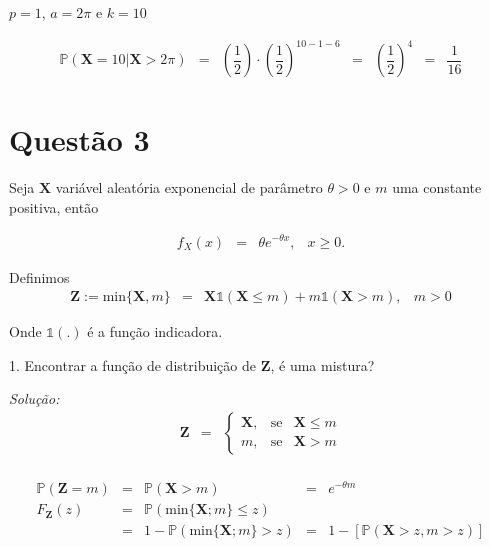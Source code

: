 \documentclass[a4paper, 11pt]{article}
\begin{document}
$p=1$, $a=2\pi$ e $k=10$

\begin{equation*}
\begin{array}{rclllll}
\mathds{P}(\mathbf{X} = 10|\mathbf{X}>2\pi) & = & \left(  \dfrac{1}{2}\right)\cdot\left(  \dfrac{1}{2}\right)^{10-1-6} & = & \left(  \dfrac{1}{2}\right)^{4} & = & \dfrac{1}{16}

\end{array}
\end{equation*}


\section*{Questão 3} 

Seja $\mathbf{X}$ variável aleatória exponencial de parâmetro $\theta > 0$ e $m$ uma constante positiva, então

\begin{equation*}
\begin{array}{lclll}
f_{X}(x) & = & \theta e^{-\theta x}, & x \geq 0.
\end{array}
\end{equation*}

\noindent
Definimos
\begin{equation*}
\begin{array}{lclll}
\mathbf{Z} := \mbox{min}\{\mathbf{X},m\} & = & \mathbf{X} \mathds{1}(\mathbf{X}\leq m) + m \mathds{1}(\mathbf{X} > m), & m>0
\end{array}
\end{equation*}

\noindent
Onde $\mathds{1}(.)$ é a função indicadora.

1. Encontrar a função de distribuição de $\mathbf{Z}$, é uma mistura?

\noindent
\textit{Solução:} \\
\begin{equation*}
\begin{array}{lcllllll}
\mathbf{Z} & = & \left\{
    \begin{array}{rrlc}
         \mathbf{X}, & \mbox{se} & \mathbf{X} \leq m \\
         m, & \mbox{se} & \mathbf{X} > m
    \end{array}
\right. \\[15pt]
\end{array}
\end{equation*}

\begin{equation*}
\begin{array}{rclll}
\mathds{P}(\mathbf{Z} = m) & = & \mathds{P}(\mathbf{X} > m) & = & e^{-\theta m}\\[15pt]

F_{\mathbf{Z}}(z) & = & \mathds{P}(\mbox{min}\{ \mathbf{X}; m\} \leq z ) \\[15pt]

& = & 1 - \mathds{P}(\mbox{min}\{ \mathbf{X}; m\} > z ) & = & 1 - [\mathds{P}(\mathbf{X} > z, m>z)] \\[15pt]

\end{array}
\end{equation*}
\end{document}
